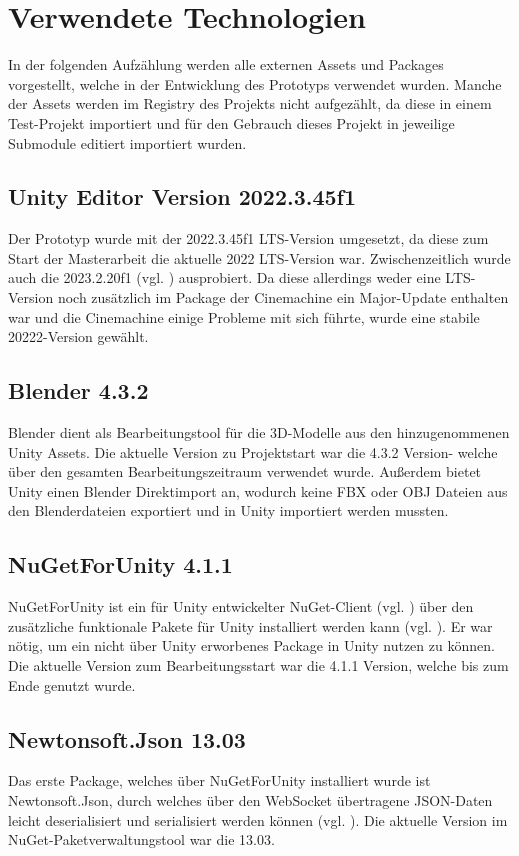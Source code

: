 \section{Verwendete Technologien}
In der folgenden Aufzählung werden alle externen Assets und Packages vorgestellt, welche in der Entwicklung des Prototyps verwendet wurden. Manche der Assets werden im Registry des Projekts nicht aufgezählt, da diese in einem Test-Projekt importiert und für den Gebrauch dieses Projekt in jeweilige Submodule editiert importiert wurden. 

\subsection{Unity Editor Version 2022.3.45f1}
Der Prototyp wurde mit der 2022.3.45f1 \ac{LTS}-Version umgesetzt, da diese zum Start der Masterarbeit die aktuelle 2022 \ac{LTS}-Version war. Zwischenzeitlich wurde auch die 2023.2.20f1 (vgl. \cite{noauthor_unity_nodate}) ausprobiert. Da diese allerdings weder eine \ac{LTS}-Version noch zusätzlich im Package der Cinemachine ein Major-Update enthalten war und die Cinemachine einige Probleme mit sich führte, wurde eine stabile 20222-Version gewählt.

\subsection{Blender 4.3.2}
Blender dient als Bearbeitungstool für die 3D-Modelle aus den hinzugenommenen Unity Assets. Die aktuelle Version zu Projektstart war die 4.3.2 Version- welche über den gesamten Bearbeitungszeitraum verwendet wurde. Außerdem bietet Unity einen Blender Direktimport an, wodurch keine \ac{FBX} oder \ac{OBJ} Dateien aus den Blenderdateien exportiert und in Unity importiert werden mussten.

\subsection{NuGetForUnity 4.1.1}
NuGetForUnity ist ein für Unity entwickelter NuGet-Client (vgl. \cite{noauthor_nuget_nodate}) über den zusätzliche funktionale Pakete für Unity installiert werden kann (vgl. \cite{mccarthy_glitchenzonugetforunity_2025}). Er war nötig, um ein nicht über Unity erworbenes Package in Unity nutzen zu können. Die aktuelle Version zum Bearbeitungsstart war die 4.1.1 Version, welche bis zum Ende genutzt wurde.

\subsection{Newtonsoft.Json 13.03}
Das erste Package, welches über NuGetForUnity installiert wurde ist Newtonsoft.Json, durch welches über den WebSocket übertragene JSON-Daten leicht deserialisiert und serialisiert werden können (vgl. \cite{newtonsoft_jsonnet_nodate}). Die aktuelle Version im NuGet-Paketverwaltungstool war die 13.03.

